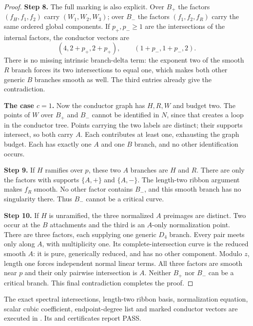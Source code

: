 \begin{proof}
\noindent\textbf{Step 8.} The full marking is also explicit. Over
$B_+$ the factors $(f_H,f_1,f_2)$ carry
$(W_1,W_2,W_3)$; over $B_-$ the factors
$(f_1,f_2,f_R)$ carry the same ordered
global components. If $p_+,p_-\ge1$ are
the intersections of the internal factors,
the conductor vectors are
\[
         (4,2+p_+,2+p_+),\qquad
         (1+p_-,1+p_-,2).
\]
There is no missing intrinsic branch-delta
term: the exponent two of the smooth $R$
branch forces its two intersections to
equal one, which makes both other generic
$B$ branches smooth as well. The third
entries already give the contradiction.

\par\medskip\noindent\textbf{The case $c=1$.}
Now the conductor graph has $H,R,W$ and
budget two. The points of $W$ over $B_+$
and $B_-$ cannot be identified in $N$,
since that creates a loop in the conductor
tree. Points carrying the two labels are
distinct; their supports intersect, so
both carry $A$. Each contributes at least
one, exhausting the graph budget. Each
has exactly one $A$ and one $B$ branch,
and no other identification occurs.

\noindent\textbf{Step 9.} If $H$ ramifies over $p$, these two
$A$ branches are $H$ and $R$. There are
only the factors with supports
$\{A,+\}$ and $\{A,-\}$. The length-two
ribbon argument makes $f_R$ smooth.
No other factor contains $B_-$, and this
smooth branch has no singularity there.
Thus $B_-$ cannot be a critical curve.

\noindent\textbf{Step 10.} If $H$ is unramified, the three normalized
$A$ preimages are distinct. Two occur
at the $B$ attachments and the third
is an $A$-only normalization point.
There are three factors, each supplying
one generic $D_4$ branch. Every pair
meets only along $A$, with multiplicity
one. Its complete-intersection curve
is the reduced smooth $A$: it is pure,
generically reduced, and has no other
component. Modulo $z$, length one forces
independent normal linear terms.
All three factors are smooth near $p$
and their only pairwise intersection is
$A$. Neither $B_+$ nor $B_-$ can be a
critical branch. This final contradiction
completes the proof.
\end{proof}

The exact spectral intersections, length-two
ribbon basis, normalization equation, scalar
cubic coefficient, endpoint-degree list and
marked conductor vectors are executed in
.
Its  and  certificates
report PASS.

